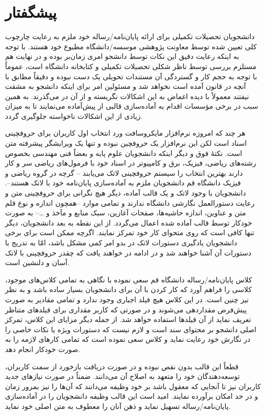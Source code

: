\chapter*{پیشگفتار}

    دانشجویان تحصيلات تکمیلی برای ارائه پایان‌نامه/رساله خود ملزم به رعایت چارچوب کلی تعیین شده توسط معاونت پژوهشی موسسه/دانشگاه مطبوع خود 
    هستند. با توجه به اینکه رعایت دقیق این نکات توسط دانشجو امری زمان‌بر بوده و در نهایت هم مستلزم بررسی توسط ناظر شکلی تحصیلات تکمیلی و 
    کتابخانه دانشگاه است، عموماً با توجه به حجم کار و گستردگی آن مستندات تحویلی یک دست نبوده و دقیقاً مطابق با آنچه در قانون آمده است 
    نخواهد شد و مسئولین امر برای اینکه دانشجو به مشقت نیفتند معمولاً با دیده اغماض به این اشکالات نگریسته و از آن در می‌گذرند. 
    به همین سبب در برخی مؤسسات اقدام به آماده‌سازی قالبی از پیش‌آماده می‌نمایند تا به میزان زیادی از این اشکالات ناخواسته جلوگیری گردد. 
    
    هر چند که امروزه نرم‌افزار مایکروسافت ورد انتخاب اول کاربران برای حروفچینی اسناد است لکن این نرم‌افزار یک حروفچین نبوده و تنها یک ویرایشگر 
    پیشرفته متن است. نکتهٔ فوق و دیگر اینکه دانشجویان علوم پایه و بعضاً فنی مهندسی بخصوص رشته‌های ریاضی، فیزیک، برق و کامپیوتر در اسناد 
    خود با فرمول‌های ریاضی سر و کار دارند بهترین انتخاب را سیستم حروفچینی لاتک \lr{(\LaTeX{})} می‌یابند --
    گرچه در گروه ریاضی و فیزیک دانشگاه قم دانشجویان ملزم به آماده‌سازی پایان‌نامه خود با لاتک هستند--. 
    دانشجویان با وجود لاتک و یک قالب آماده، 
     دیگر هیچ نگرانی برای حروفچینی متن و رعایت دستورالعمل نگارشی دانشگاه ندارند و تمامی موارد 
    --همچون اندازه و نوع قلم متن و عناوین، اندازه حاشیه‌ها، صفحات 
    آغازین، سبک منابع و مآخذ و \ldots \hspace{2mm}-- به صورت خودکار توسط قالب آماده شده اعمال می‌گردد. 
    از این نقطه به بعد دانشجویان، دیگر تنها کافی است که روی متحوای کار خود تمرکز نمایند. 
    اگرچه ممکن است برای برخی دانشجویان یادگیری دستورات لاتک در بدو امر کمی مشکل باشد، امّا به تدریج با دستورات آن آشنا خواهند شد و 
    در ادامه در خواهند یافت که چقدر حروفچینی با لاتک آسان و دلنشین است. 
    
    کلاس پایان‌نامه/رساله دانشگاه قم سعی نموده با نگاهی به تمامی کلاس‌های موجود، کلاسی را فراهم آورد که کار کردن با آن برای دانشجویان بسیار ساده باشد و به نظر 
    نیز چنین است. در این کلاس هیچ فیلد اجباری وجود ندارد و تمامی مقادیر به صورت پیش‌فرض مقداردهی می‌شوند و در صورتی که کاربر 
    مقداری برای فیلدهای متناظر تعریف نماید از آن فیلد‌ها استفاده خواهد شد. از جمله دیگر مزایای این کلاس، تمرکز اصلی دانشجو بر محتوای سند 
    است و لازم نیست که دستورات ویژه یا نکات خاصی را در نگارش خود رعایت نماید و کلاس سعی نموده است که تمامی کارهای لازمه را به صورت 
    خودکار انجام دهد. 
    
    قطعاً این قالب بدون نقص نبوده و در صورت دریافت بازخورد از سمت کاربران، توسعه‌دهندگان خود را متعهد به اصلاح آن می‌دانند. ضمناً در صورت 
    نیازهای جدید کاربران نیز تا آنجایی که معقول باشد بر خود وظیفه می‌دانند که آن‌ها را نیز بمرور زمان و در حد امکان برآورده نمایند. امید است 
    این قالب وظیفه دانشجویان را در آماده‌سازی پایان‌نامه/رساله تسهیل نماید و ذهن آنان را معطوف به متن اصلی خود نماید. 
